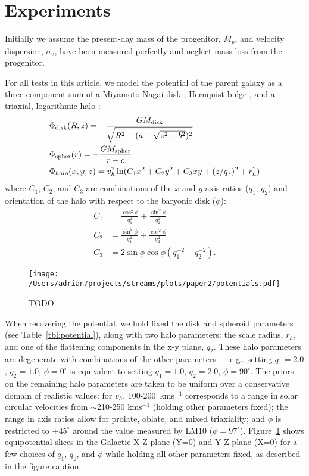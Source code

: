 \documentclass[letterpaper,12pt,preprint]{aastex}
\begin{document}
\section{Experiments}
Initially we assume the present-day mass of the progenitor, $M_p$, and velocity dispersion, $\sigma_v$, have been measured perfectly and neglect mass-loss from the progenitor. 

For all tests in this article, we model the potential of the parent galaxy as a three-component sum of a Miyamoto-Nagai disk \citep{}, Hernquist bulge \citep[spheroid;][]{}, and a triaxial, logarithmic halo \citep[e.g.,][]{law10}:
\begin{align}
	&\Phi_{\rm disk}(R,z) = -\frac{GM_{\rm disk}}{\sqrt{R^2 + (a + \sqrt{z^2 + b^2})^2}}\\
	&\Phi_{\rm spher}(r) = -\frac{GM_{\rm spher}}{r + c}\\
	&\Phi_{halo}(x,y,z) = v_{h}^2 \ln(C_1 x^2 + C_2 y^2 + C_3 xy + (z/q_z)^2 + r_h^2)
\end{align}
where $C_1$, $C_2$, and $C_3$ are combinations of the $x$ and $y$ axis
ratios ($q_1$, $q_2$) and orientation of the halo with respect to the
baryonic disk ($\phi$):
\begin{align}
  C_1 &= \frac{\cos^2\phi}{q_1^2} + \frac{\sin^2\phi}{q_2^2}\\
  C_2 &= \frac{\sin^2\phi}{q_1^2} + \frac{\cos^2\phi}{q_2^2}\\
  C_3 &= 2\sin\phi\cos\phi \left(q_1^{-2} - q_2^{-2}\right).
\end{align}

\begin{figure}[h]
\begin{center}
\texttt{[image: /Users/adrian/projects/streams/plots/paper2/potentials.pdf]}
\caption{ TODO }\label{fig:potential}
\end{center}
\end{figure}

When recovering the potential, we hold fixed the disk and spheroid parameters (see Table~\ref{tbl:potential}), along with two halo parameters: the scale radius, $r_h$, and one of the flattening components in the x-y plane, $q_2$. These halo parameters are degenerate with combinations of the other parameters --- e.g., setting $q_1=2.0$, $q_2=1.0$, $\phi=0^\circ$ is equivalent to setting $q_1=1.0$, $q_2=2.0$, $\phi=90^\circ$. The priors on the remaining halo parameters are taken to be uniform over a conservative domain of realistic values: for $v_h$, 100-200~kms$^{-1}$ corresponds to a range in solar circular velocities from $\sim$210-250 kms$^{-1}$ (holding other parameters fixed); the range in axis ratios allow for prolate, oblate, and mixed triaxiality; and $\phi$ is restricted to $\pm45^\circ$ around the value measured by LM10 ($\phi = 97^\circ$). Figure~\ref{fig:potential} shows equipotential slices in the Galactic X-Z plane (Y=0) and Y-Z plane (X=0) for a few choices of  $q_1$,  $q_z$, and $\phi$ while holding all other parameters fixed, as described in the figure caption.
\end{document}
